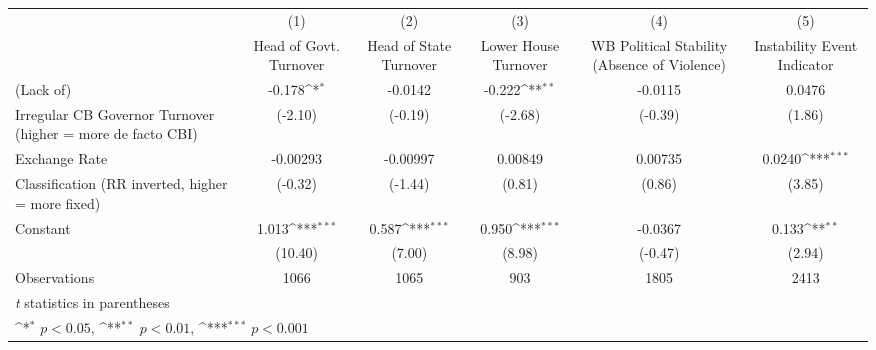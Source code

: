 {
\def\sym#1{\ifmmode^{#1}\else\(^{#1}\)\fi}
\begin{tabular}{l*{5}{c}}
\toprule
                &\multicolumn{1}{c}{(1)}&\multicolumn{1}{c}{(2)}&\multicolumn{1}{c}{(3)}&\multicolumn{1}{c}{(4)}&\multicolumn{1}{c}{(5)}\\
                &\multicolumn{1}{c}{Head of Govt. Turnover}&\multicolumn{1}{c}{Head of State Turnover}&\multicolumn{1}{c}{Lower House Turnover}&\multicolumn{1}{c}{WB Political Stability (Absence of Violence)}&\multicolumn{1}{c}{Instability Event Indicator}\\
\midrule
(Lack of)       &   -0.178\sym{*}  &  -0.0142         &   -0.222\sym{**} &  -0.0115         &   0.0476         \\
Irregular CB Governor Turnover (higher = more de facto CBI)&  (-2.10)         &  (-0.19)         &  (-2.68)         &  (-0.39)         &   (1.86)         \\
\addlinespace
Exchange Rate   & -0.00293         & -0.00997         &  0.00849         &  0.00735         &   0.0240\sym{***}\\
Classification (RR inverted, higher = more fixed)&  (-0.32)         &  (-1.44)         &   (0.81)         &   (0.86)         &   (3.85)         \\
\addlinespace
Constant        &    1.013\sym{***}&    0.587\sym{***}&    0.950\sym{***}&  -0.0367         &    0.133\sym{**} \\
                &  (10.40)         &   (7.00)         &   (8.98)         &  (-0.47)         &   (2.94)         \\
\midrule
Observations    &     1066         &     1065         &      903         &     1805         &     2413         \\
\bottomrule
\multicolumn{6}{l}{\footnotesize \textit{t} statistics in parentheses}\\
\multicolumn{6}{l}{\footnotesize \sym{*} \(p<0.05\), \sym{**} \(p<0.01\), \sym{***} \(p<0.001\)}\\
\end{tabular}
}
